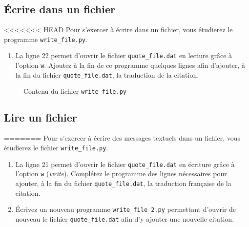 
\subsection{Écrire dans un fichier}

<<<<<<< HEAD
Pour s'exercer à écrire dans un fichier, vous étudierez le programme \texttt{write\_file.py}.

\begin{enumerate}

\item La ligne 22 permet d'ouvrir le fichier \texttt{quote\_file.dat} en lecture grâce
  à l'option \texttt{w}.
  Ajoutez à la fin de ce programme quelques lignes afin d'ajouter, à la fin du
  fichier \texttt{quote\_file.dat}, la traduction de la citation.

\end{enumerate}

\begin{figure}  
  
  \caption{Contenu du fichier \texttt{write\_file.py}}
  \label{stat_write_file}
\end{figure}

\subsection{Lire un fichier}
=======
Pour s'exercer à écrire des messages textuels dans un fichier, vous étudierez le fichier \texttt{write\_file.py}.

\begin{enumerate}

\item La ligne 21 permet d'ouvrir le fichier \texttt{quote\_file.dat} en écriture grâce
  à l'option \texttt{w} (\emph{write}).
  Complétez le programme des lignes nécessaires pour ajouter, à la fin du
  fichier \texttt{quote\_file.dat}, la traduction française de la citation.

\item   Écrivez   un  nouveau   programme   \texttt{write\_file\_2.py}
  permettant d'ouvrir  de nouveau le  fichier \texttt{quote\_file.dat}
  afin d'y ajouter une nouvelle citation.

\end{enumerate}




